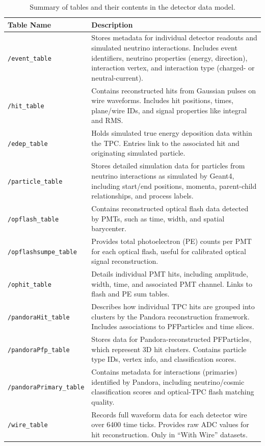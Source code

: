\documentclass{pracalicmgr}
\begin{document}
\begin{table}[H]
\centering
\begin{tabular}{|l|p{10.5cm}|}
\hline
\textbf{Table Name} & \textbf{Description} \\
\hline
\texttt{/event\_table} & Stores metadata for individual detector readouts and simulated neutrino interactions. Includes event identifiers, neutrino properties (energy, direction), interaction vertex, and interaction type (charged- or neutral-current). \\
\hline
\texttt{/hit\_table} & Contains reconstructed hits from Gaussian pulses on wire waveforms. Includes hit positions, times, plane/wire IDs, and signal properties like integral and RMS. \\
\hline
\texttt{/edep\_table} & Holds simulated true energy deposition data within the TPC. Entries link to the associated hit and originating simulated particle. \\
\hline
\texttt{/particle\_table} & Stores detailed simulation data for particles from neutrino interactions as simulated by Geant4, including start/end positions, momenta, parent-child relationships, and process labels. \\
\hline
\texttt{/opflash\_table} & Contains reconstructed optical flash data detected by PMTs, such as time, width, and spatial barycenter. \\
\hline
\texttt{/opflashsumpe\_table} & Provides total photoelectron (PE) counts per PMT for each optical flash, useful for calibrated optical signal reconstruction. \\
\hline
\texttt{/ophit\_table} & Details individual PMT hits, including amplitude, width, time, and associated PMT channel. Links to flash and PE sum tables. \\
\hline
\texttt{/pandoraHit\_table} & Describes how individual TPC hits are grouped into clusters by the Pandora reconstruction framework. Includes associations to PFParticles and time slices. \\
\hline
\texttt{/pandoraPfp\_table} & Stores data for Pandora-reconstructed PFParticles, which represent 3D hit clusters. Contains particle type IDs, vertex info, and classification scores. \\
\hline
\texttt{/pandoraPrimary\_table} & Contains metadata for interactions (primaries) identified by Pandora, including neutrino/cosmic classification scores and optical-TPC flash matching quality. \\
\hline
\texttt{/wire\_table} & Records full waveform data for each detector wire over 6400 time ticks. Provides raw ADC values for hit reconstruction. Only in ``With Wire'' datasets. \\
\hline
\end{tabular}
\caption{Summary of tables and their contents in the detector data model.}
\label{tab:data_tables}
\end{table}
\end{document}
